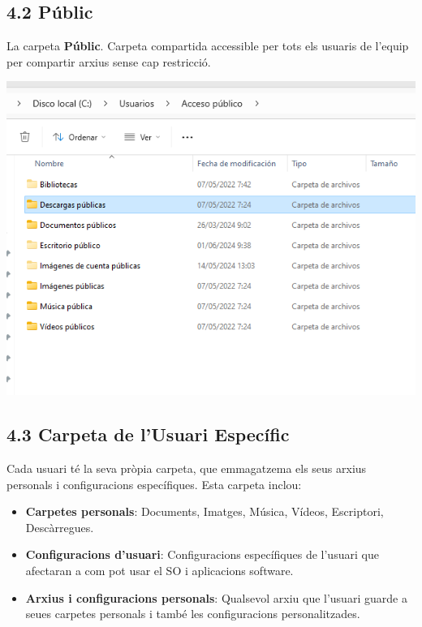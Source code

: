 \documentclass[
  a4paper,
]{article}
\providecommand{\tightlist}{%
  \setlength{\itemsep}{0pt}\setlength{\parskip}{0pt}}
\begin{document}
\subsection{4.2 Públic}\label{puxfablic}

La carpeta \textbf{Públic}. Carpeta compartida accessible per tots els
usuaris de l'equip per compartir arxius sense cap restricció.

\includegraphics{png/CarpetesPublico.png}

\subsection{4.3 Carpeta de l'Usuari
Específic}\label{carpeta-de-lusuari-especuxedfic}

Cada usuari té la seva pròpia carpeta, que emmagatzema els seus arxius
personals i configuracions específiques. Esta carpeta inclou:

\begin{itemize}
\tightlist
\item
  \textbf{Carpetes personals}: Documents, Imatges, Música, Vídeos,
  Escriptori, Descàrregues.
\item
  \textbf{Configuracions d'usuari}: Configuracions específiques de
  l'usuari que afectaran a com pot usar el SO i aplicacions software.
\item
  \textbf{Arxius i configuracions personals}: Qualsevol arxiu que
  l'usuari guarde a seues carpetes personals i també les configuracions
  personalitzades.
\end{itemize}
\end{document}

